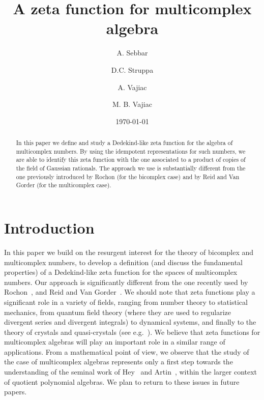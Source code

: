 \documentclass[reqno]{amsart}
\theoremstyle{plain}
\theoremstyle{definition}
\theoremstyle{remark}
\numberwithin{equation}{section}
\begin{document}
\title[Zeta function for multicomplex algebra]{A zeta function for
  multicomplex algebra}

\author{A. Sebbar}\address{Institut de Math\'ematiques de Bordeaux, Universit\'e
  Bordeaux 1, 351 cours de la Lib\'eration, 33405 Talence cedex,
  France}

\author{D.C. Struppa}\address{Chapman University, One University Drive, Orange CA 92866}
\author{A. Vajiac}\address{Chapman University, One University Drive, Orange CA 92866}
\author{M. B. Vajiac}\address{Chapman University, One University Drive, Orange CA 92866}

\date{\today}
\begin{abstract}
  In this paper we define and study a Dedekind-like zeta function for
  the algebra of multicomplex numbers. By using the idempotent
  representations for such numbers, we are able to identify this zeta
  function with the one associated to a product of copies of the field
  of Gaussian rationals. The approach we use is substantially
  different from the one previously introduced by Rochon (for the
  bicomplex case) and by Reid and Van Gorder (for the multicomplex
  case).
\end{abstract}

\maketitle

\section{Introduction}
\label{sec:intro}

In this paper we build on the resurgent interest for the theory of
bicomplex and multicomplex numbers, to develop a definition (and
discuss the fundamental properties) of a Dedekind-like zeta function
for the spaces of multicomplex numbers. Our approach is significantly
different from the one recently used by Rochon~\cite{rochon_zeta}, and
Reid and Van Gorder~\cite{reid}. We should note that zeta functions
play a significant role in a variety of fields, ranging from number
theory to statistical mechanics, from quantum field theory (where they
are used to regularize divergent series and divergent integrals) to
dynamical systems, and finally to the theory of crystals and
quasi-crystals (see e.g.~\cite{moody}). We believe that zeta functions
for multicomplex algebras will play an important role in a similar
range of applications. From a mathematical point of view, we observe
that the study of the case of multicomplex algebras represents only a
first step towards the understanding of the seminal work of
Hey~\cite{hey} and Artin~\cite{artin}, within the larger context of
quotient polynomial algebras. We plan to return to these issues in
future papers.
\end{document}
